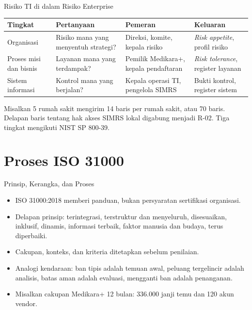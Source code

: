 \documentclass[aspectratio=169, table, 12pt]{beamer}
\begin{document}
\begin{frame}{{\Large Risiko TI di dalam Risiko Enterprise}}
  \vspace{4pt}
  \footnotesize
  \begin{tabularx}{\textwidth}{|>{\raggedright\arraybackslash}p{}|>{\raggedright\arraybackslash}X|>{\raggedright\arraybackslash}X|>{\raggedright\arraybackslash}X|}
    \hline
    \textbf{Tingkat} & \textbf{Pertanyaan} & \textbf{Pemeran} & \textbf{Keluaran} \\ \hline
    Organisasi & Risiko mana yang menyentuh strategi? & Direksi, komite, kepala risiko &
    \textit{Risk appetite}, profil risiko \\ \hline
    Proses misi dan bisnis & Layanan mana yang terdampak? & Pemilik Medikara+, kepala pendaftaran &
    \textit{Risk tolerance}, register layanan \\ \hline
    Sistem informasi & Kontrol mana yang berjalan? & Kepala operasi TI, pengelola SIMRS & Bukti
    kontrol, register sistem \\ \hline
  \end{tabularx}

  \vspace{6pt}
  \small Misalkan 5 rumah sakit mengirim 14 baris per rumah sakit, atau 70 baris. Delapan baris
  tentang hak akses SIMRS lokal digabung menjadi R-02. Tiga tingkat mengikuti NIST SP 800-39.
\end{frame}

\section{Proses ISO 31000}

\begin{frame}{{\Large Prinsip, Kerangka, dan Proses}}
  \vspace{6pt}
  \small
  \begin{itemize}
    \item ISO 31000:2018 memberi panduan, bukan persyaratan sertifikasi organisasi.
    \item Delapan prinsip: terintegrasi, terstruktur dan menyeluruh, disesuaikan, inklusif, dinamis,
          informasi terbaik, faktor manusia dan budaya, terus diperbaiki.
    \item Cakupan, konteks, dan kriteria ditetapkan sebelum penilaian.
    \item Analogi kendaraan: ban tipis adalah temuan awal, peluang tergelincir adalah analisis,
          batas aman adalah evaluasi, mengganti ban adalah penanganan.
    \item Misalkan cakupan Medikara+ 12 bulan: 336.000 janji temu dan 120 akun vendor.
  \end{itemize}
\end{frame}
\end{document}
